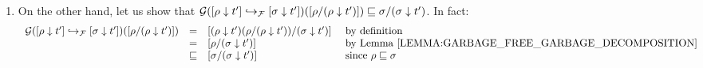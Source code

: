 \begin{enumerate}
\begin{enumerate}
\begin{enumerate}
\begin{enumerate}
\[\begin{array}{rcll}
              & \permle & \redseqtwo/(\redseqtwo \sieve \tm') & \text{since $\redseq \permle \redseqtwo$ by hypothesis} \\
              \end{array}
            \]
            Note that this is garbage by .
            So by , $(\redseq \sieve \tm')/(\redseqtwo \sieve \tm')$ is also garbage,
            as required.
      \item On the other hand, let us show that
            $\mathcal{G}({[\rho \downarrow t']} \hookrightarrow_{\mathcal{F}} {[\sigma \downarrow t']})({[\rho/(\rho \downarrow t')]})
            \sqsubseteq
            \sigma/(\sigma \downarrow t')$.
            In fact:
            \[
              \begin{array}{rcll}
                \ulbG(\ptF{\cls{\redseqtwo \sieve \tm'}}{\cls{\redseq \sieve \tm'}})(\cls{\redseq/(\redseq \sieve \tm')})
              & = &
                \cls{ (\redseq \sieve \tm')(\redseq/(\redseq \sieve \tm')) / (\redseqtwo \sieve \tm') } & \text{ by definition} \\
              & = &
                \cls{ \redseq / (\redseqtwo \sieve \tm') } & \text{ by \rlem{garbage_free_garbage_decomposition}} \\
              & \permle &
                \cls{ \redseqtwo / (\redseqtwo \sieve \tm') } & \text{ since $\redseq \permle \redseqtwo$} \\
              \end{array}
            \]
             

\end{enumerate}
\end{enumerate}
\end{enumerate}
\end{enumerate}
